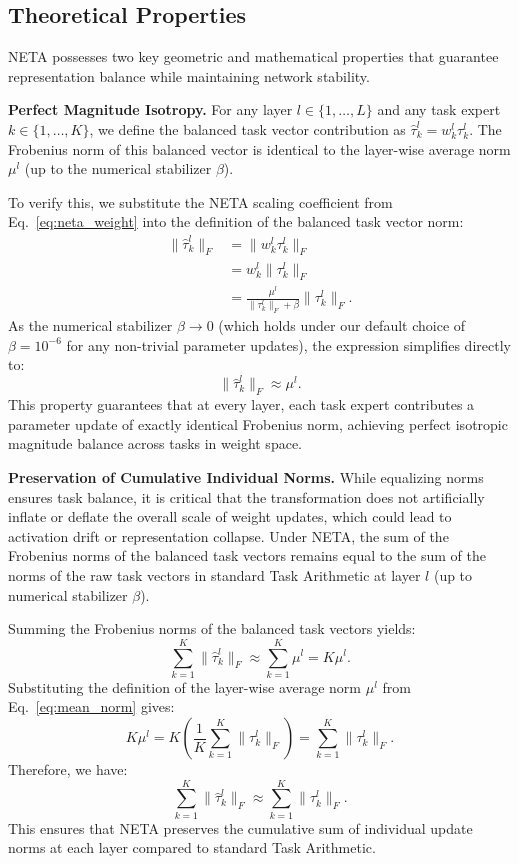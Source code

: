 \subsection{Theoretical Properties}
NETA possesses two key geometric and mathematical properties that guarantee representation balance while maintaining network stability.

\textbf{Perfect Magnitude Isotropy.}
For any layer $l \in \{1, \dots, L\}$ and any task expert $k \in \{1, \dots, K\}$, we define the balanced task vector contribution as $\hat{\tau}_k^l = w_k^l \tau_k^l$. The Frobenius norm of this balanced vector is identical to the layer-wise average norm $\mu^l$ (up to the numerical stabilizer $\beta$). 

To verify this, we substitute the NETA scaling coefficient from Eq.~\ref{eq:neta_weight} into the definition of the balanced task vector norm:
\begin{align}
\|\hat{\tau}_k^l\|_F &= \|w_k^l \tau_k^l\|_F \nonumber \\
&= w_k^l \|\tau_k^l\|_F \nonumber \\
&= \frac{\mu^l}{\|\tau_k^l\|_F + \beta} \|\tau_k^l\|_F.
\end{align}
As the numerical stabilizer $\beta \rightarrow 0$ (which holds under our default choice of $\beta = 10^{-6}$ for any non-trivial parameter updates), the expression simplifies directly to:
\begin{equation}
\|\hat{\tau}_k^l\|_F \approx \mu^l.
\end{equation}
This property guarantees that at every layer, each task expert contributes a parameter update of exactly identical Frobenius norm, achieving perfect isotropic magnitude balance across tasks in weight space.

\textbf{Preservation of Cumulative Individual Norms.}
While equalizing norms ensures task balance, it is critical that the transformation does not artificially inflate or deflate the overall scale of weight updates, which could lead to activation drift or representation collapse. Under NETA, the sum of the Frobenius norms of the balanced task vectors remains equal to the sum of the norms of the raw task vectors in standard Task Arithmetic at layer $l$ (up to numerical stabilizer $\beta$).

Summing the Frobenius norms of the balanced task vectors yields:
\begin{equation}
\sum_{k=1}^K \|\hat{\tau}_k^l\|_F \approx \sum_{k=1}^K \mu^l = K \mu^l.
\end{equation}
Substituting the definition of the layer-wise average norm $\mu^l$ from Eq.~\ref{eq:mean_norm} gives:
\begin{equation}
K \mu^l = K \left(\frac{1}{K} \sum_{k=1}^K \|\tau_k^l\|_F\right) = \sum_{k=1}^K \|\tau_k^l\|_F.
\end{equation}
Therefore, we have:
\begin{equation}
\sum_{k=1}^K \|\hat{\tau}_k^l\|_F \approx \sum_{k=1}^K \|\tau_k^l\|_F.
\end{equation}
This ensures that NETA preserves the cumulative sum of individual update norms at each layer compared to standard Task Arithmetic. 

